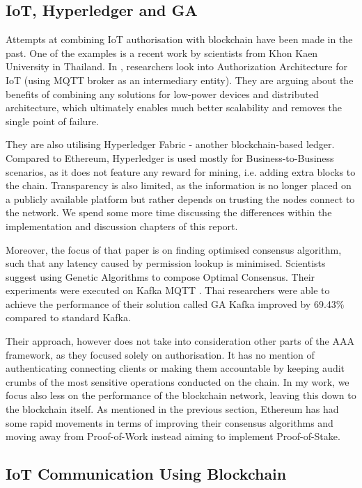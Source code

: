 \subsection{IoT, Hyperledger and GA}
Attempts at combining IoT authorisation with blockchain have been made in the past. One of the examples is a recent work by scientists from Khon Kaen University in Thailand. In \citet{klaokliang2018novel}, researchers look into Authorization Architecture for IoT (using MQTT broker as an intermediary entity). They are arguing about the benefits of combining any solutions for low-power devices and distributed architecture, which ultimately enables much better scalability and removes the single point of failure.

They are also utilising Hyperledger Fabric - another blockchain-based ledger. Compared to Ethereum, Hyperledger \cite{cachin2016architecture} is used mostly for Business-to-Business scenarios, as it does not feature any reward for mining, i.e. adding extra blocks to the chain. Transparency is also limited, as the information is no longer placed on a publicly available platform but rather depends on trusting the nodes connect to the network. We spend some more time discussing the differences within the implementation and discussion chapters of this report.

Moreover, the focus of that paper is on finding optimised consensus algorithm, such that any latency caused by permission lookup is minimised. Scientists suggest using Genetic Algorithms to compose Optimal Consensus. Their experiments were executed on Kafka MQTT \cite{waehner_2019}. Thai researchers were able to achieve the performance of their solution called GA Kafka improved by 69.43\% compared to standard Kafka.

Their approach, however does not take into consideration other parts of the AAA framework, as they focused solely on authorisation. It has no mention of authenticating connecting clients or making them accountable by keeping audit crumbs of the most sensitive operations conducted on the chain. In my work, we focus also less on the performance of the blockchain network, leaving this down to the blockchain itself. As mentioned in the previous section, Ethereum has had some rapid movements in terms of improving their consensus algorithms and moving away from Proof-of-Work instead aiming to implement Proof-of-Stake.

\subsection{IoT Communication Using Blockchain}

